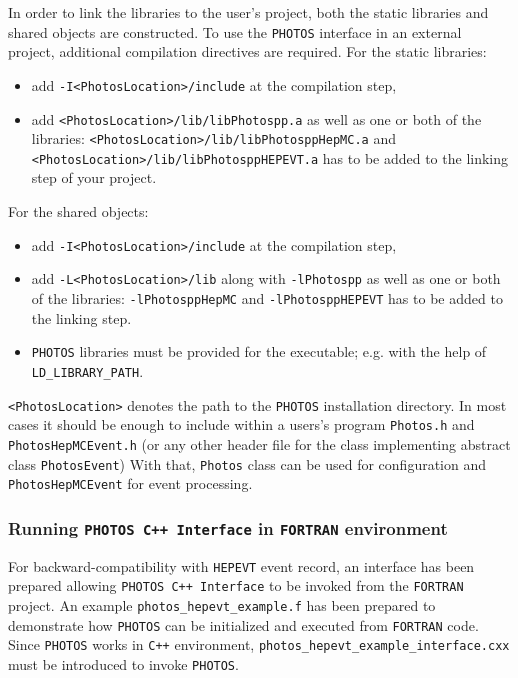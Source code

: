 \documentclass[]{Photos_interface_design}
\begin{document}
In order to link the libraries to the user's project, both the static libraries and shared objects are
constructed. To use the {\tt PHOTOS} interface in an external project, additional 
compilation directives are required. For the static libraries:
\begin{itemize}
  \item add {\tt -I<PhotosLocation>/include} at the compilation step,
  \item add {\tt <PhotosLocation>/lib/libPhotospp.a} as well as one or both of the libraries: 
            {\tt <PhotosLocation>/lib/libPhotosppHepMC.a} and
            {\tt <PhotosLocation>/lib/libPhotosppHEPEVT.a} has to be added to the linking step of your project.
\end{itemize}
For the shared objects:
\begin{itemize}
  \item add {\tt -I<PhotosLocation>/include} at the compilation step,
  \item add {\tt -L<PhotosLocation>/lib} along with {\tt -lPhotospp} as well as one or both of the libraries:
            {\tt -lPhotosppHepMC} and {\tt -lPhotosppHEPEVT} has to be added to the linking step.
  \item  {\tt PHOTOS} libraries must be provided for the executable; e.g. with the help of {\tt LD\_LIBRARY\_PATH}.
\end{itemize}
{\tt <PhotosLocation>} denotes the path to the {\tt PHOTOS} installation directory.
In most cases it should be enough to include within a users's program {\tt Photos.h} and {\tt PhotosHepMCEvent.h} (or any other header file for the class implementing abstract class {\tt PhotosEvent})
With that, {\tt Photos} class can be used for configuration and {\tt PhotosHepMCEvent}
for event processing.

\subsubsection{Running {\tt PHOTOS C++ Interface} in {\tt FORTRAN} environment}

For backward-compatibility with {\tt HEPEVT} event record, an interface has been prepared
allowing {\tt PHOTOS C++ Interface} to be invoked from the {\tt FORTRAN} project. An example
{\tt photos\_hepevt\_example.f} has been prepared to demonstrate how {\tt PHOTOS} can be
initialized and executed from {\tt FORTRAN} code. Since {\tt PHOTOS} works in {\tt C++} environment,
{\tt photos\_hepevt\_example\_interface.cxx} must be introduced to invoke {\tt PHOTOS}.
\end{document}
